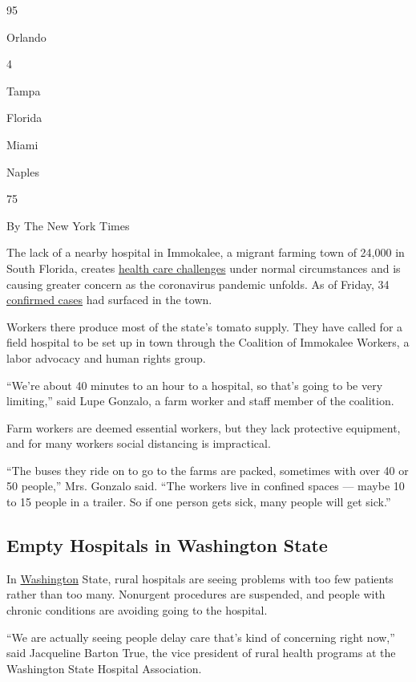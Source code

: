 95

Orlando

4

Tampa

Florida

Miami

Naples

75

By The New York Times

The lack of a nearby hospital in Immokalee, a migrant farming town of
24,000 in South Florida, creates
\href{https://www.nytimes3xbfgragh.onion/2018/09/05/us/rural-florida-hospital.html}{health
care challenges} under normal circumstances and is causing greater
concern as the coronavirus pandemic unfolds. As of Friday, 34
\href{https://www.naplesnews.com/story/news/2020/04/22/coronavirus-florida-updates-covid-19-collier-county/3002125001/}{confirmed
cases} had surfaced in the town.

Workers there produce most of the state's tomato supply. They have
called for a field hospital to be set up in town through the Coalition
of Immokalee Workers, a labor advocacy and human rights group.

``We're about 40 minutes to an hour to a hospital, so that's going to be
very limiting,'' said Lupe Gonzalo, a farm worker and staff member of
the coalition.

Farm workers are deemed essential workers, but they lack protective
equipment, and for many workers social distancing is impractical.

``The buses they ride on to go to the farms are packed, sometimes with
over 40 or 50 people,'' Mrs. Gonzalo said. ``The workers live in
confined spaces --- maybe 10 to 15 people in a trailer. So if one person
gets sick, many people will get sick.''

\hypertarget{empty-hospitals-in-washington-state}{%
\subsection{Empty Hospitals in Washington
State}\label{empty-hospitals-in-washington-state}}

In
\href{https://www.nytimes3xbfgragh.onion/interactive/2020/us/washington-coronavirus-cases.html}{Washington}
State, rural hospitals are seeing problems with too few patients rather
than too many. Nonurgent procedures are suspended, and people with
chronic conditions are avoiding going to the hospital.

``We are actually seeing people delay care that's kind of concerning
right now,'' said Jacqueline Barton True, the vice president of rural
health programs at the Washington State Hospital Association.

